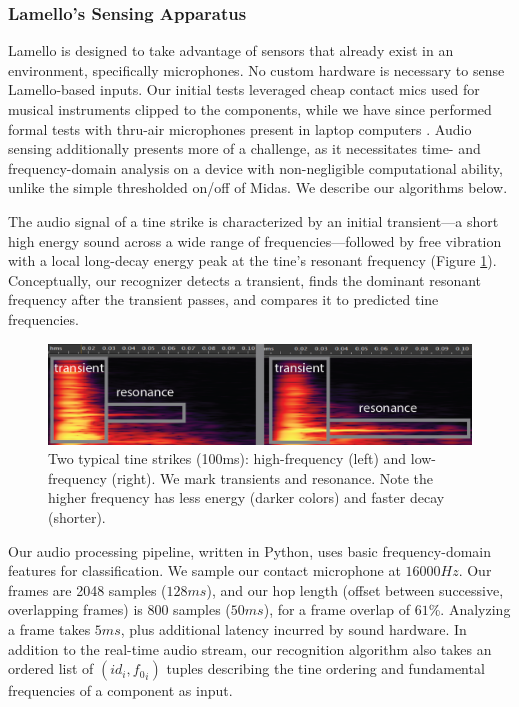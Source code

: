     \subsubsection{Lamello's Sensing Apparatus}
    
    Lamello is designed to take advantage of sensors that already exist in an environment, specifically microphones. No custom hardware is necessary to sense Lamello-based inputs. Our initial tests leveraged cheap contact mics used for musical instruments clipped to the components, while we have since performed formal tests with thru-air microphones present in laptop computers . Audio sensing additionally presents more of a challenge, as it necessitates time- and frequency-domain analysis on a device with non-negligible computational ability, unlike the simple thresholded on/off of Midas. We describe our algorithms below.

    The audio signal of a tine strike is characterized by an initial transient---a short high energy sound across a wide range of frequencies---followed by free vibration with a local long-decay energy peak at the tine's resonant frequency (Figure \ref{fig:lamello-transient}). Conceptually, our recognizer detects a transient, finds the dominant resonant frequency after the transient passes, and compares it to predicted tine frequencies.
    
    
\begin{figure}
  \centering
    \includegraphics[width=\textwidth]{figures/lamello/transient-resonance.png}
  \caption{Two typical tine strikes (100ms): high-frequency (left) and low-frequency (right).  We mark transients and resonance.  Note the higher frequency has less energy (darker colors) and faster decay (shorter).} 
  \label{fig:lamello-transient}
\end{figure}

    Our audio processing pipeline, written in Python, uses basic frequency-domain features for classification. We sample our contact microphone at $16000Hz$. Our frames are 2048 samples ($128ms$), and our hop length (offset between successive, overlapping frames) is 800 samples ($50ms$), for a frame overlap of $61$\%. Analyzing a frame takes $5ms$, plus additional latency incurred by sound hardware. In addition to the real-time audio stream, our recognition algorithm also takes an ordered list of $(id_i,{f_0}_i)$ tuples describing the tine ordering and fundamental frequencies of a component as input.


